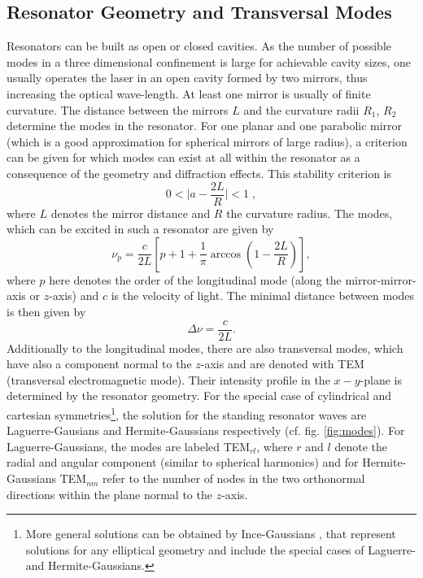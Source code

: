 \documentclass[a4paper]{scrartcl}
\numberwithin{equation}{section}
\numberwithin{figure}{section}
\numberwithin{table}{section}
\newcommand{\eq}[2]{\begin{equation}#1\label{#2}\end{equation}}
\begin{document}
\subsection{Resonator Geometry and Transversal Modes}
Resonators can be built as open or closed cavities. As the number of possible modes in a three dimensional confinement is large for achievable cavity sizes, one usually operates the laser in an open cavity formed by two mirrors, thus increasing the optical wave-length. At least one mirror is usually of finite curvature. The distance between the mirrors $L$ and the curvature radii $R_1$, $R_2$ determine the modes in the resonator. For one planar and one parabolic mirror (which is a good approximation for spherical mirrors of large radius), a criterion can be given for which modes can exist at all within the resonator as a consequence of the geometry and diffraction effects. This stability criterion is
\eq{ 0 < \lvert a- \frac{2L}{R} \rvert <1 \; ,}{stability}
where $L$ denotes the mirror distance and $R$ the curvature radius. The modes, which can be excited in such a resonator are given by 
\eq{\nu_p = \frac{c}{2L} \left[ p+1+\frac{1}{\pi}\arccos \left( 1-\frac{2L}{R}\right) \right] , } {modes}
where $p$ here denotes the order of the longitudinal mode (along the mirror-mirror-axis or $z$-axis) and $c$ is the velocity of light. The minimal distance between modes is then given by
\eq{\Delta \nu = \frac{c}{2L} .}{}
Additionally to the longitudinal modes, there are also transversal modes, which have also a component normal to the $z$-axis and are denoted with TEM (transversal electromagnetic mode). Their intensity profile in the $x-y$-plane is determined by the resonator geometry. For the special case of cylindrical and cartesian symmetries\footnote{More general solutions can be obtained by Ince-Gaussians \cite{ince}, that represent solutions for any elliptical geometry and include the special cases of Laguerre- and Hermite-Gaussians.}, the solution for the standing resonator waves are Laguerre-Gausians and Hermite-Gaussians respectively (cf.  fig. \ref{fig:modes}). For Laguerre-Gaussians, the modes are labeled TEM$_{rl}$, where $r$ and $l$ denote the radial and angular component (similar to spherical harmonics) and for Hermite-Gaussians TEM$_{nm}$ refer to the number of nodes in the two orthonormal directions within the plane normal to the $z$-axis.
\end{document}
